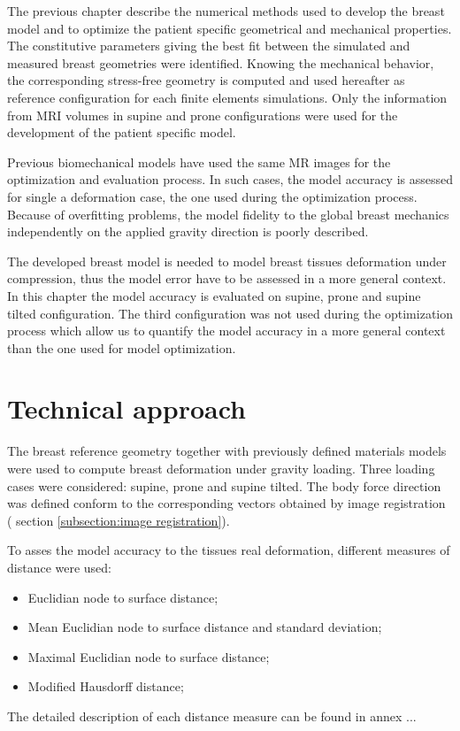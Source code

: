 

The previous chapter describe the numerical methods used to develop the breast model and to optimize the patient specific geometrical and mechanical properties. The constitutive parameters giving the best fit between the simulated and measured breast geometries were identified. Knowing the mechanical behavior, the corresponding stress-free geometry is computed and used hereafter as reference configuration for each finite elements simulations. Only the information from MRI volumes in supine and prone configurations were used for the development of the patient specific model. 

Previous biomechanical models have used the same MR images for the optimization and evaluation process. In such cases, the model accuracy is assessed for single a deformation case, the one used during the optimization process. Because of overfitting problems, the model fidelity to the global breast mechanics independently on the applied gravity direction is poorly described. 

The developed breast model is needed to model breast tissues deformation under compression, thus the model error have to be assessed in a more general context. In this chapter  the model accuracy is evaluated on supine, prone and supine tilted configuration. The third configuration was not used during the optimization process which allow us to quantify the model accuracy in a more general context than the one used for model optimization.
 

\clearpage

\section{Technical approach}\label{section:validation:technical approach}

The breast reference geometry together with previously defined materials models were used to compute breast deformation under gravity loading. Three loading cases were considered: supine, prone and supine tilted. The body force direction was defined conform to the corresponding vectors obtained by image registration ( section \ref{subsection:image registration}). 

To asses the model accuracy to the tissues real deformation, different measures of distance were used: 
\begin{itemize}
\item  Euclidian node to surface distance;
\item  Mean Euclidian node to surface distance and standard deviation;
\item  Maximal Euclidian node to surface distance; 
\item  Modified Hausdorff distance;
\end{itemize} 
The detailed description of each distance measure can be found in annex ...

